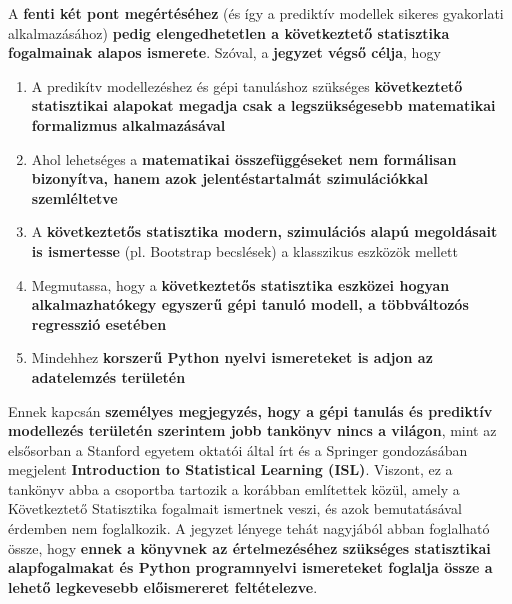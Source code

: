 \documentclass[
]{book}
\providecommand{\tightlist}{%
  \setlength{\itemsep}{0pt}\setlength{\parskip}{0pt}}
\begin{document}
A \textbf{fenti két pont megértéséhez} (és így a prediktív modellek sikeres gyakorlati alkalmazásához) \textbf{pedig elengedhetetlen a következtető statisztika fogalmainak alapos ismerete}. Szóval, a \textbf{jegyzet végső célja}, hogy

\begin{enumerate}
\def\labelenumi{\arabic{enumi}.}
\tightlist
\item
  A predikítv modellezéshez és gépi tanuláshoz szükséges \textbf{következtető statisztikai alapokat megadja csak a legszükségesebb matematikai formalizmus alkalmazásával}
\item
  Ahol lehetséges a \textbf{matematikai összefüggéseket nem formálisan bizonyítva, hanem azok jelentéstartalmát szimulációkkal szemléltetve}
\item
  A \textbf{következtetős statisztika modern, szimulációs alapú megoldásait is ismertesse} (pl. Bootstrap becslések) a klasszikus eszközök mellett
\item
  Megmutassa, hogy a \textbf{következtetős statisztika eszközei hogyan alkalmazhatókegy egyszerű gépi tanuló modell, a többváltozós regresszió esetében}
\item
  Mindehhez \textbf{korszerű Python nyelvi ismereteket is adjon az adatelemzés területén}
\end{enumerate}

Ennek kapcsán \textbf{személyes megjegyzés, hogy a gépi tanulás és prediktív modellezés területén szerintem jobb tankönyv nincs a világon}, mint az elsősorban a Stanford egyetem oktatói által írt és a Springer gondozásában megjelent \textbf{Introduction to Statistical Learning (ISL)}. Viszont, ez a tankönyv abba a csoportba tartozik a korábban említettek közül, amely a Következtető Statisztika fogalmait ismertnek veszi, és azok bemutatásával érdemben nem foglalkozik. A jegyzet lényege tehát nagyjából abban foglalható össze, hogy \textbf{ennek a könyvnek az értelmezéséhez szükséges statisztikai alapfogalmakat és Python programnyelvi ismereteket foglalja össze a lehető legkevesebb előismereret feltételezve}.
\end{document}
